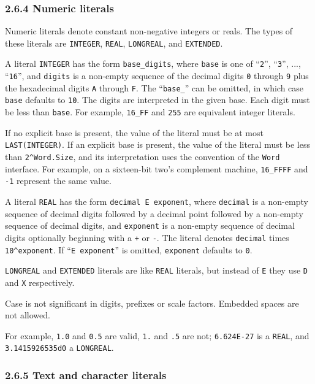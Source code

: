 \documentclass[10pt]{article}
\begin{document}
\subsubsection*{2.6.4 Numeric literals}

Numeric literals denote constant non-negative integers or reals.  The types of
these literals are \verb|INTEGER|, \verb|REAL|, \verb|LONGREAL|, and
\verb|EXTENDED|.

A literal \verb|INTEGER| has the form \verb|base_digits|, where \verb|base| is
one of ``\verb|2|'', ``\verb|3|'', ..., ``\verb|16|'', and \verb|digits| is a
non-empty sequence of the decimal digits \verb|0| through \verb|9| plus the
hexadecimal digits \verb|A| through \verb|F|.  The ``\verb|base_|'' can be
omitted, in which case \verb|base| defaults to \verb|10|.  The digits are
interpreted in the given base.  Each digit must be less than \verb|base|.  For
example, \verb|16_FF| and \verb|255| are equivalent integer literals.

If no explicit base is present, the value of the literal must be at most
\verb|LAST(INTEGER)|.  If an explicit base is present, the value of the
literal must be less than \verb|2^Word.Size|, and its interpretation uses the
convention of the \verb|Word| interface.  For example, on a sixteen-bit two's
complement machine, \verb|16_FFFF| and \verb|-1| represent the same value.

A literal \verb|REAL| has the form \verb|decimal E exponent|, where
\verb|decimal| is a non-empty sequence of decimal digits followed by a decimal
point followed by a non-empty sequence of decimal digits, and \verb|exponent|
is a non-empty sequence of decimal digits optionally beginning with a \verb|+|
or \verb|-|.  The literal denotes \verb|decimal| times \verb|10^exponent|.  If
``\verb|E exponent|'' is omitted, \verb|exponent| defaults to \verb|0|.

\verb|LONGREAL| and \verb|EXTENDED| literals are like \verb|REAL| literals,
but instead of \verb|E| they use \verb|D| and \verb|X| respectively.

Case is not significant in digits, prefixes or scale factors.  Embedded spaces
are not allowed.

For example, \verb|1.0| and \verb|0.5| are valid, \verb|1.| and \verb|.5| are
not; \verb|6.624E-27| is a \verb|REAL|, and \verb|3.1415926535d0| a
\verb|LONGREAL|.

\subsubsection*{2.6.5 Text and character literals}
\end{document}
